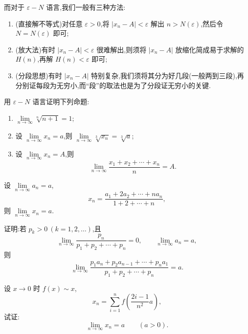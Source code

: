 \documentclass[../数学分析培优讲义.tex]{subfiles}
\begin{document}
而对于 $\varepsilon-N$ 语言,我们一般有三种方法:

\begin{enumerate}[label=\textcircled{\arabic*},leftmargin=2.2em]
  \item (直接解不等式)对任意 $\varepsilon>0$,将 $|x_n-A|<\varepsilon$ 解出
  $n>N(\varepsilon)$,然后令 $N=N(\varepsilon)$ 即可;
  \item (放大法)有时 $|x_n-A|<\varepsilon$ 很难解出,则须将 $|x_n-A|$ 放缩化简成易于求解的
  $H(n)$,再解 $H(n)<\varepsilon$ 即可;
  \item (分段思想)有时 $|x_n-A|$ 特别复杂,我们须将其分为好几段(一般两到三段),再分别证每段为无穷小,而``段''的取法也是为了分段证无穷小的关键.
\end{enumerate}

\begin{example}
用 $\varepsilon-N$ 语言证明下列命题:
\begin{enumerate}[label=(\arabic*)]
  \item $\displaystyle \lim\limits_{n\to\infty}\sqrt[n]{n+1}=1$;
  \item 设 $\displaystyle \lim\limits_{n\to\infty}x_n=a$,则
  $\displaystyle \lim\limits_{n\to\infty}\sqrt[3]{x_n}=\sqrt[3]{a}$;
  \item 设 $\displaystyle \lim\limits_{n\to\infty}x_n=A$,则
  \[
  \lim\limits_{n\to\infty}\dfrac{x_1+x_2+\cdots+x_n}{n}=A.
  \]
\end{enumerate}
\end{example}
\exampleblank

\begin{example}
设 $\displaystyle \lim\limits_{n\to\infty}a_n=a$,
\[
x_n=\dfrac{a_1+2a_2+\cdots+na_n}{1+2+\cdots+n},
\]
则 $\displaystyle \lim\limits_{n\to\infty}x_n=a$.
\end{example}
\exampleblank

\begin{example}
证明:若 $p_k>0\ (k=1,2,\ldots)$,且
\[
\lim\limits_{n\to\infty}\dfrac{p_n}{p_1+p_2+\cdots+p_n}=0,
\qquad
\lim\limits_{n\to\infty}a_n=a,
\]
则
\[
\lim\limits_{n\to\infty}
\dfrac{p_1a_n+p_2a_{n-1}+\cdots+p_na_1}{p_1+p_2+\cdots+p_n}=a.
\]
\end{example}
\exampleblank

\begin{example}
设 $x\to0$ 时 $f(x)\sim x$,
\[
x_n=\sum\limits_{i=1}^n f\left(\dfrac{2i-1}{n^2}a\right),
\]
试证:
\[
\lim\limits_{n\to\infty}x_n=a\qquad(a>0).
\]
\end{example}
\exampleblank
\end{document}

